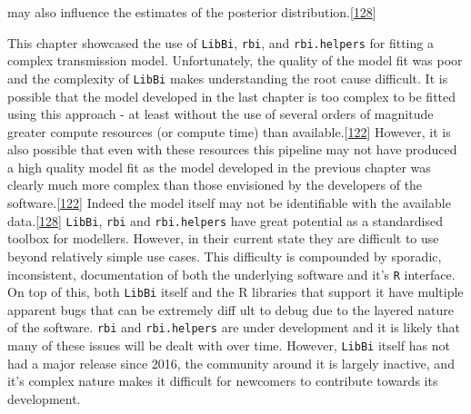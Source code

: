 \documentclass[11pt,twoside]{bristolthesis}
\begin{document}
may also influence the estimates of the posterior distribution.{[}\protect\hyperlink{ref-Lintusaari2016}{128}{]}
  
  This chapter showcased the use of \texttt{LibBi}, \texttt{rbi}, and \texttt{rbi.helpers} for fitting a complex transmission model. Unfortunately, the quality of the model fit was poor and the complexity of \texttt{LibBi} makes understanding the root cause difficult. It is possible that the model developed in the last chapter is too complex to be fitted using this approach - at least without the use of several orders of magnitude greater compute resources (or compute time) than available.{[}\protect\hyperlink{ref-Murray2015}{122}{]} However, it is also possible that even with these resources this pipeline may not have produced a high quality model fit as the model developed in the previous chapter was clearly much more complex than those envisioned by the developers of the software.{[}\protect\hyperlink{ref-Murray2015}{122}{]} Indeed the model itself may not be identifiable with the available data.{[}\protect\hyperlink{ref-Lintusaari2016}{128}{]} \texttt{LibBi}, \texttt{rbi} and \texttt{rbi.helpers} have great potential as a standardised toolbox for modellers. However, in their current state they are difficult to use beyond relatively simple use cases. This difficulty is compounded by sporadic, inconsistent, documentation of both the underlying software and it's \texttt{R} interface. On top of this, both \texttt{LibBi} itself and the R libraries that support it have multiple apparent bugs that can be extremely diff ult to debug due to the layered nature of the software. \texttt{rbi} and \texttt{rbi.helpers} are under development and it is likely that many of these issues will be dealt with over time. However, \texttt{LibBi} itself has not had a major release since 2016, the community around it is largely inactive, and it's complex nature makes it difficult for newcomers to contribute towards its development.
  
\end{document}
